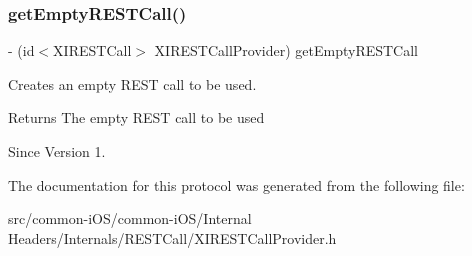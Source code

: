 \subsubsection{\texorpdfstring{get\+Empty\+R\+E\+S\+T\+Call()}{getEmptyRESTCall()}}
{\footnotesize\ttfamily -\/ (id$<$X\+I\+R\+E\+S\+T\+Call$>$ X\+I\+R\+E\+S\+T\+Call\+Provider) get\+Empty\+R\+E\+S\+T\+Call \begin{DoxyParamCaption}{ }\end{DoxyParamCaption}}



Creates an empty R\+E\+ST call to be used. 

\begin{DoxyReturn}{Returns}
The empty R\+E\+ST call to be used 
\end{DoxyReturn}
\begin{DoxySince}{Since}
Version 1. 
\end{DoxySince}


The documentation for this protocol was generated from the following file\+:\begin{DoxyCompactItemize}
\item 
src/common-\/i\+O\+S/common-\/i\+O\+S/\+Internal Headers/\+Internals/\+R\+E\+S\+T\+Call/X\+I\+R\+E\+S\+T\+Call\+Provider.\+h\end{DoxyCompactItemize}
